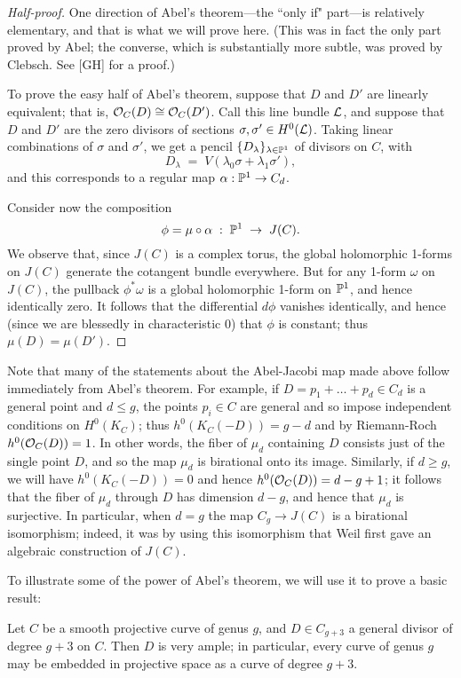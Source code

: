 \begin{proof}[Half-proof]
One direction of Abel's theorem---the ``only if" part---is relatively elementary, and that is what we will prove here. (This was in fact the only part proved by Abel; the converse, which is substantially more subtle, was proved by Clebsch. See \cite{} [GH] for a proof.)

To prove the easy half of Abel's theorem, suppose that $D$ and $D'$ are linearly equivalent; that is, $\cO_C(D) \cong \cO_C(D')$. Call this line bundle $\cL$, and suppose that $D$ and $D'$ are the zero divisors of sections $\sigma, \sigma' \in H^0(\cL)$.
Taking linear combinations of $\sigma$ and $\sigma'$, we get a pencil $\{D_\lambda\}_{\lambda \in \PP^1}$ of divisors on $C$, with
$$
D_\lambda \; = \; V(\lambda_0\sigma + \lambda_1\sigma'),
$$
and this corresponds to a regular map $\alpha : \PP^1 \to C_d$. 

Consider now the composition
$$
\phi = \mu \circ \alpha \; : \; \PP^1 \; \to \; J(C).
$$
We observe that, since $J(C)$ is a complex torus, the global holomorphic 1-forms on $J(C)$ generate the cotangent bundle everywhere. But for any 1-form $\omega$ on $J(C)$, the pullback $\phi^*\omega$ is a global holomorphic 1-form on $\PP^1$, and hence identically zero. It follows that the differential $d\phi$ vanishes identically, and hence (since we are blessedly in characteristic 0) that $\phi$ is constant; thus $\mu(D) = \mu(D')$.
\end{proof}

Note that many of the statements about the Abel-Jacobi map made above follow immediately from Abel's theorem. For example, if  $D = p_1+\dots+p_d\in C_d$ is a general point and $d \leq g$, the points $p_i \in C$ are general and so impose independent conditions on $H^0(K_C)$; thus $h^0(K_C(-D)) = g-d$ and by Riemann-Roch $h^0(\cO_C(D)) = 1$. In other words, the fiber of $\mu_d$ containing $D$ consists just of the single point $D$, and so the map $\mu_d$ is birational onto its image. Similarly, if $d \geq g$, we will have $h^0(K_C(-D)) = 0$ and hence $h^0(\cO_C(D)) = d-g+1$; it follows that the fiber of $\mu_d$ through $D$ has dimension $d-g$, and hence that $\mu_d$ is surjective. In particular, when $d=g$ the map $C_g \to J(C)$ is a birational isomorphism; indeed, it was by using this isomorphism that Weil first gave an algebraic construction of $J(C)$.

To illustrate some of the power of Abel's theorem, we will use it to prove a basic result:

\begin{theorem}\label{g+3 theorem}
Let $C$ be a smooth projective curve of genus $g$, and $D \in C_{g+3}$ a general divisor of degree $g+3$ on $C$. Then $D$ is very ample; in particular, every curve of genus $g$ may be embedded in projective space as a curve of degree $g+3$.
\end{theorem}

